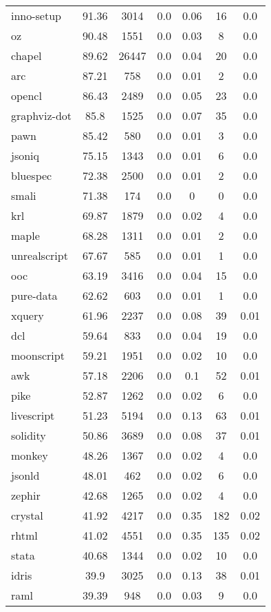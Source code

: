 \begin{longtable}{l|ccc|ccc}
inno-setup & 91.36 & 3014 & 0.0 & 0.06 & 16 & 0.0 \\
oz & 90.48 & 1551 & 0.0 & 0.03 & 8 & 0.0 \\
chapel & 89.62 & 26447 & 0.0 & 0.04 & 20 & 0.0 \\
arc & 87.21 & 758 & 0.0 & 0.01 & 2 & 0.0 \\
opencl & 86.43 & 2489 & 0.0 & 0.05 & 23 & 0.0 \\
graphviz-dot & 85.8 & 1525 & 0.0 & 0.07 & 35 & 0.0 \\
pawn & 85.42 & 580 & 0.0 & 0.01 & 3 & 0.0 \\
jsoniq & 75.15 & 1343 & 0.0 & 0.01 & 6 & 0.0 \\
bluespec & 72.38 & 2500 & 0.0 & 0.01 & 2 & 0.0 \\
smali & 71.38 & 174 & 0.0 & 0 & 0 & 0.0 \\
krl & 69.87 & 1879 & 0.0 & 0.02 & 4 & 0.0 \\
maple & 68.28 & 1311 & 0.0 & 0.01 & 2 & 0.0 \\
unrealscript & 67.67 & 585 & 0.0 & 0.01 & 1 & 0.0 \\
ooc & 63.19 & 3416 & 0.0 & 0.04 & 15 & 0.0 \\
pure-data & 62.62 & 603 & 0.0 & 0.01 & 1 & 0.0 \\
xquery & 61.96 & 2237 & 0.0 & 0.08 & 39 & 0.01 \\
dcl & 59.64 & 833 & 0.0 & 0.04 & 19 & 0.0 \\
moonscript & 59.21 & 1951 & 0.0 & 0.02 & 10 & 0.0 \\
awk & 57.18 & 2206 & 0.0 & 0.1 & 52 & 0.01 \\
pike & 52.87 & 1262 & 0.0 & 0.02 & 6 & 0.0 \\
livescript & 51.23 & 5194 & 0.0 & 0.13 & 63 & 0.01 \\
solidity & 50.86 & 3689 & 0.0 & 0.08 & 37 & 0.01 \\
monkey & 48.26 & 1367 & 0.0 & 0.02 & 4 & 0.0 \\
jsonld & 48.01 & 462 & 0.0 & 0.02 & 6 & 0.0 \\
zephir & 42.68 & 1265 & 0.0 & 0.02 & 4 & 0.0 \\
crystal & 41.92 & 4217 & 0.0 & 0.35 & 182 & 0.02 \\
rhtml & 41.02 & 4551 & 0.0 & 0.35 & 135 & 0.02 \\
stata & 40.68 & 1344 & 0.0 & 0.02 & 10 & 0.0 \\
idris & 39.9 & 3025 & 0.0 & 0.13 & 38 & 0.01 \\
raml & 39.39 & 948 & 0.0 & 0.03 & 9 & 0.0 \\

\end{longtable}
